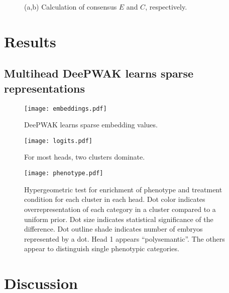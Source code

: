 \documentclass{article}
\begin{document}
\begin{figure}

     \begin{subfigure}[b]{0.5\textwidth}
        
         \caption{}
         \label{fig:}
     \end{subfigure}
     \hfill
     \begin{subfigure}[b]{\textwidth}
       
       \caption{}
       \label{fig:}
     \end{subfigure}

  \vspace{1cm}
     
     \begin{subfigure}[b]{0.5\textwidth}
       
         \caption{}
         \label{fig:}
     \end{subfigure}
     \hfill
     \begin{subfigure}[b]{0.5\textwidth}
        
         \caption{}
         \label{fig:}
     \end{subfigure}

     \caption{(a,b) Calculation of consensus $E$ and $C$, respectively.}
     \label{fig:}
\end{figure}

\section{Results}

\subsection{Multihead DeePWAK learns sparse representations}

\begin{figure}
  \texttt{[image: embeddings.pdf]}
    \caption{DeePWAK learns sparse embedding values. }
    \label{fig:}
\end{figure}

    
\begin{figure}
  \texttt{[image: logits.pdf]}
  \caption{For most heads, two clusters dominate.}
  \label{fig:}
\end{figure}

\begin{figure}
  \texttt{[image: phenotype.pdf]}
  \caption{Hypergeometric test for enrichment of phenotype and treatment condition for each cluster in each head. Dot color indicates overrepresentation of each category in a cluster compared to a uniform prior. Dot size indicates statistical significance of the difference. Dot outline shade indicates number of embryos represented by a dot. Head 1 appears ``polysemantic''. The others appear to distinguish single phenotypic categories.}
  \label{fig:}
\end{figure}

\section{Discussion}

\printbibliography
\end{document}
